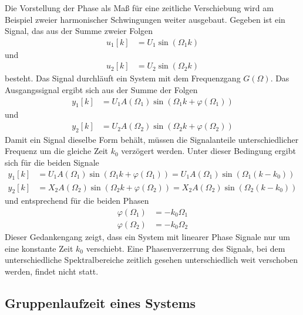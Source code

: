 Die Vorstellung der Phase als Maß für eine zeitliche Verschiebung wird am Beispiel zweier harmonischer Schwingungen weiter ausgebaut. Gegeben ist ein Signal, das aus der Summe zweier Folgen
\begin{align}
u_{1}[ k] &= U_{1}  \sin\left( \Omega_{1}  k \right) \label{eq:8.69}
\end{align}
und
\begin{align}
u_{2}[ k] &= U_{2}  \sin\left( \Omega_{2}  k \right) \label{eq:8.70}
\end{align}
besteht. Das Signal durchläuft ein System mit dem Frequenzgang \(G(Ω)\). Das Ausgangssignal ergibt sich aus der Summe der Folgen
\begin{align}
y_{1}[ k] &= U_{1}  A\left( \Omega_{1} \right)  \sin\left( \Omega_{1}  k + \varphi\left( \Omega_{1} \right) \right) \label{eq:8.71}
\end{align}
und
\begin{align}
y_{2}[ k] &= U_{2}  A\left( \Omega_{2} \right)  \sin\left( \Omega_{2}  k + \varphi\left( \Omega_{2} \right) \right) \label{eq:8.72}
\end{align}
Damit ein Signal dieselbe Form behält, müssen die Signalanteile unterschiedlicher Frequenz um die gleiche Zeit \(k_{0}\) verzögert werden. Unter dieser Bedingung ergibt sich für die beiden Signale
\begin{align}
y_{1}[ k] &= U_{1}  A\left( \Omega_{1} \right)\sin\left( \Omega_{1}  k + \varphi\left( \Omega_{1} \right) \right) = U_{1}  A\left( \Omega_{1} \right)  \sin\left( \Omega_{1}  \left( k - k_{0} \right) \right) \label{eq:8.73} \\
y_{2}[ k] &= X_{2}  A\left( \Omega_{2} \right)  \sin\left( \Omega_{2}  k + \varphi\left( \Omega_{2} \right) \right) = X_{2}  A\left( \Omega_{2} \right)  \sin\left( \Omega_{2}  \left( k - k_{0} \right) \right) \label{eq:8.74}
\end{align}
und entsprechend für die beiden Phasen
\begin{align}
\varphi\left( \Omega_{1} \right) &= - k_{0}  \Omega_{1} \label{eq:8.75} \\
\varphi\left( \Omega_{2} \right) &= - k_{0}  \Omega_{2} \label{eq:8.76}
\end{align}
Dieser Gedankengang zeigt, dass ein System mit linearer Phase Signale nur um eine konstante Zeit \(k_{0}\) verschiebt. Eine Phasenverzerrung des Signals, bei dem unterschiedliche Spektralbereiche zeitlich gesehen unterschiedlich weit verschoben werden, findet nicht statt.

\subsection{Gruppenlaufzeit eines Systems}\label{sec:8.4.4}

